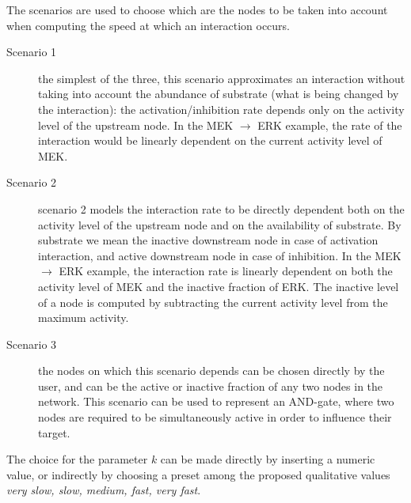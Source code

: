 \documentclass[submission,copyright,creativecommons]{eptcs}
\begin{document}
The scenarios are used to choose which are the nodes to be taken into account
when computing the speed at which an interaction occurs.
\begin{description}
  \item[Scenario 1] the simplest of the three, this scenario approximates an interaction
    without taking into account the abundance of substrate (what is being
    changed by the interaction): the activation/inhibition rate
    depends only on the activity level of the upstream node. In the MEK $\rightarrow$ ERK
    example, the rate of the interaction would be linearly dependent on the current activity level of MEK.
  \item[Scenario 2] scenario 2 models the interaction rate
    to be directly dependent both on the activity
    level of the upstream node and on the availability of substrate. By substrate we
    mean the inactive downstream node in case of activation interaction, and active downstream node in case of inhibition.
    In the MEK $\rightarrow$ ERK example, the interaction rate is linearly dependent on
    both the activity level of MEK and the inactive fraction of ERK.
    The inactive level of a node is computed by subtracting the current activity level from the maximum activity.
  \item[Scenario 3] the nodes on which this scenario depends can be chosen directly by the user,
    and can be the active or inactive fraction of any two nodes in the network.
    This scenario can be used to represent an AND-gate, where two nodes are required to
    be simultaneously active in order to influence their target.
\end{description}

The choice for the parameter $k$ can be made directly by inserting a numeric value, or
indirectly by choosing a preset among the proposed qualitative values \emph{very slow, slow, medium, fast, very fast}.
\end{document}
